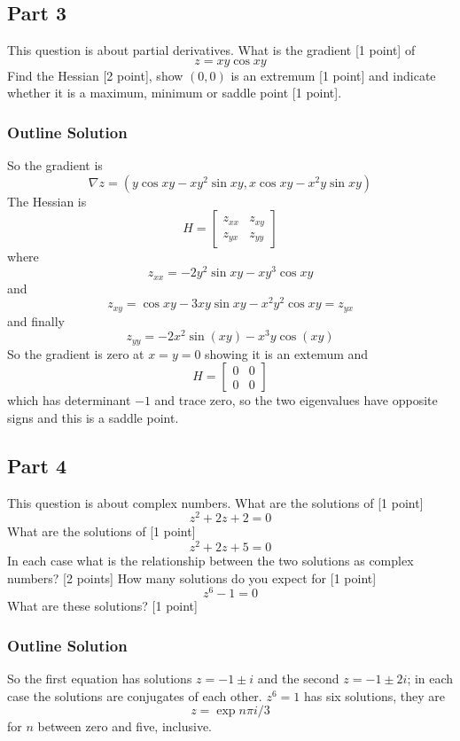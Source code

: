 \documentclass[11pt,a4paper]{scrartcl}
\begin{document}
      \subsection*{Part 3}
      This question is about partial derivatives. What is the gradient [1 point] of
      $$
      z=xy\cos{xy}
      $$
      Find the Hessian [2 point], show $(0,0)$ is an extremum [1 point] and indicate whether it is a maximum, minimum or saddle point [1 point].

      \subsubsection{Outline Solution}
      So the gradient is
      $$\nabla z=\left(y\cos{xy}-xy^2\sin{xy},x\cos{xy}-x^2y\sin{xy}\right)$$
      The Hessian is
      $$H=\left[\begin{array}{cc}z_{xx}&z_{xy}\\z_{yx}&z_{yy}\end{array}\right]$$
      where
      $$z_{xx} = -2y^2\sin{xy}-xy^3\cos{xy}$$
      and
      $$z_{xy} = \cos{xy}-3xy\sin{xy}-x^2y^2\cos{xy}=z_{yx}$$
      and finally
$$z_{yy}= -2x^2\sin(xy) - x^3y\cos(xy)$$
      So the gradient is zero at $x=y=0$ showing it is an extemum and
      $$H=\left[\begin{array}{cc}0&0\\0&0\end{array}\right]$$
      which has determinant $-1$ and trace zero, so the two eigenvalues have opposite signs and this is a saddle point.

      \subsection*{Part 4}
      This question is about complex numbers. What are the solutions of [1 point]
      $$z^2+2z+2=0$$
      What are the solutions of [1 point]
      $$z^2+2z+5=0$$
      In each case what is the relationship between the two solutions as complex numbers? [2 points]
      How many solutions do you expect for [1 point]
      $$z^{6}-1=0$$
      What are these solutions? [1 point]

      \subsubsection*{Outline Solution}
      So the first equation has solutions $z=-1\pm i$ and the second $z=-1\pm 2i$; in each case the solutions are conjugates of each other. $z^6=1$ has six solutions, they are
      \begin{equation}
        z=\exp{n\pi i/3}
      \end{equation}
      for $n$ between zero and five, inclusive.
\end{document}
